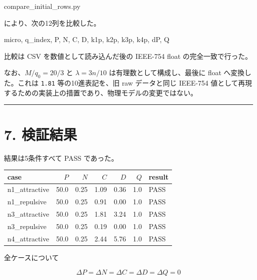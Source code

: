 \documentclass[
  a4paper,
]{ltjsarticle}
\newenvironment{Shaded}{}{}
\newcommand{\NormalTok}[1]{#1}
\newcounter{none} %
\begin{document}
\begin{Shaded}
\begin{Highlighting}[]
\NormalTok{compare\_initial\_rows.py}
\end{Highlighting}
\end{Shaded}

により、次の12列を比較した。

\begin{Shaded}
\begin{Highlighting}[]
\NormalTok{micro, q\_index, P, N, C, D,}
\NormalTok{k1p, k2p, k3p, k4p, dP, Q}
\end{Highlighting}
\end{Shaded}

比較は CSV を数値として読み込んだ後の IEEE-754 float
の完全一致で行った。

なお、\(M/q_0=20/3\) と \(\lambda=3n/10\) は有理数として構成し、最後に
float へ変換した。これは \texttt{1.81} 等の10進表記を、旧 raw
データと同じ IEEE-754
値として再現するための実装上の措置であり、物理モデルの変更ではない。

\begin{center}\rule{0.5\linewidth}{0.5pt}\end{center}

\section{7. 検証結果}\label{ux691cux8a3cux7d50ux679c}

結果は5条件すべて PASS であった。

{\def\LTcaptype{none} %
\begin{longtable}[]{@{}lrrrrrl@{}}
\toprule\noalign{}
case & \(P\) & \(N\) & \(C\) & \(D\) & \(Q\) & result \\
\midrule\noalign{}
\endhead
\bottomrule\noalign{}
\endlastfoot
n1\_attractive & 50.0 & 0.25 & 1.09 & 0.36 & 1.0 & PASS \\
n1\_repulsive & 50.0 & 0.25 & 0.91 & 0.00 & 1.0 & PASS \\
n3\_attractive & 50.0 & 0.25 & 1.81 & 3.24 & 1.0 & PASS \\
n3\_repulsive & 50.0 & 0.25 & 0.19 & 0.00 & 1.0 & PASS \\
n4\_attractive & 50.0 & 0.25 & 2.44 & 5.76 & 1.0 & PASS \\
\end{longtable}
}

全ケースについて

\[
\boxed{
\Delta P=
\Delta N=
\Delta C=
\Delta D=
\Delta Q=0
}
\]
\end{document}
